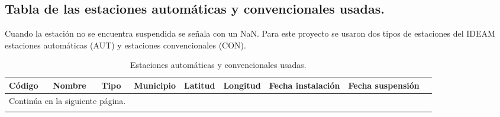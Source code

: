 \appendix
\clearpage
\addappheadtotoc
\appendixpage
\begin{landscape}
\chapter{Tabla de las estaciones automáticas y convencionales usadas.}
\label{anexo:estaciones_autom_y_conv_usadas}

Cuando la estación no se encuentra suspendida se señala con un NaN. Para este proyecto se usaron dos tipos de estaciones del IDEAM estaciones automáticas (AUT) y estaciones convencionales (CON).


\newpage


\begin{longtable}{lp{4cm}lp{3cm}lrrll}
\caption{Estaciones automáticas y convencionales usadas.}
\label{tab:estaciones}\\
\toprule
 Código &                      Nombre & Tipo &              Municipio &   Latitud &   Longitud &  Fecha instalación &  Fecha suspensión \\
\midrule
\endhead
\midrule
\multicolumn{3}{r}{{Continúa en la siguiente página.}} \\
\midrule
\endfoot


\end{longtable}
\end{landscape}
